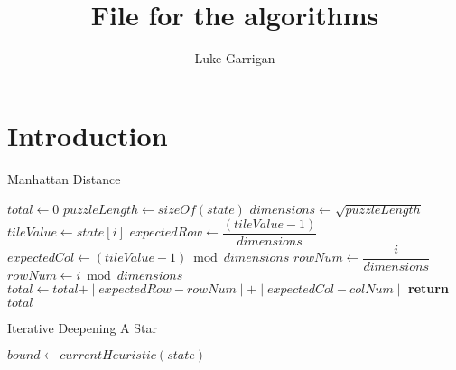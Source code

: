 \documentclass[progress]{cmpreport}
\title{File for the algorithms}
\author{Luke Garrigan}
\begin{document}
	
	
	\section{Introduction}

	

	\makeatletter
	\def\BState{\State\hskip-\ALG@thistlm}
	\makeatother
	
	\begin{algorithm}
		\caption{Manhattan Distance}\label{Manhattan Distance}
		\begin{algorithmic}[1]
				
			\State$total\gets 0$
			\State$puzzleLength\gets sizeOf(state)$
			\State$dimensions\gets \sqrt{puzzleLength}$
				
				\State $tileValue\gets state[i]$
				\State $expectedRow\gets \dfrac{(tileValue -1)}{dimensions}$
				\State $expectedCol\gets (tileValue -1)\bmod dimensions$
				\State $rowNum \gets \dfrac{i}{dimensions}$
				\State $rowNum\gets i \bmod dimensions$
				\State $total\gets total \texttt{+} \mid{expectedRow-rowNum}\mid\texttt{+}\mid{expectedCol-colNum}\mid$
			\EndFor
			\State \textbf{return} $total$
			\EndProcedure
		\end{algorithmic}
	\end{algorithm}

	
	
	
	\begin{algorithm}
		\caption{Iterative Deepening A Star}\label{IDAStar}
		\begin{algorithmic}[1]
			\Procedure{IDAStar}{$state$}
			\State$bound\gets currentHeuristic(state)$ 
			\EndProcedure
		\end{algorithmic}
    \end{algorithm}

	
	
\end{document}

